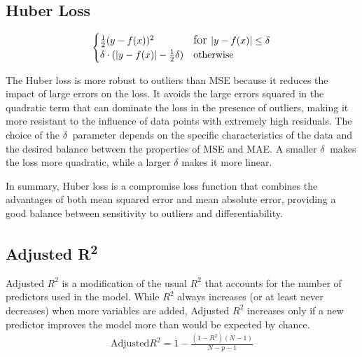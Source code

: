 \documentclass[10pt,a4paper]{article}
\begin{document}
	\subsection{Huber Loss}
			\label{Huberloss}
		
			\begin{align*}
					\begin{cases}
						\frac{1}{2}(y - f(x))^2 & \large\text{for } |y - f(x)| \leq \delta \\
						\delta \cdot (|y - f(x)| - \frac{1}{2}\delta) & \text{otherwise}
					\end{cases}
			\end{align*}
		
		
			The Huber loss is more robust to outliers than MSE because it reduces the impact of large errors on the loss. It avoids the large errors squared in the quadratic term that can dominate the loss in the presence of outliers, making it more resistant to the influence of data points with extremely high residuals.
			The choice of the $\delta\ $ parameter depends on the specific characteristics of the data and the desired balance between the properties of MSE and MAE.
			A smaller $\delta\ $ makes the loss more quadratic, while a larger $\delta$ makes it more linear.
		
			In summary, Huber loss is a compromise loss function that combines the advantages of both mean squared error and mean absolute error, providing a good balance between sensitivity to outliers and differentiability.

	\subsection{Adjusted R\textsuperscript{2}}
	Adjusted $R^2$ is a modification of the usual $R^2$ that accounts for the number of predictors used in the model.
	While $R^2$ always increases (or at least never decreases) when more variables are added,
	Adjusted $R^2$ increases only if a new predictor improves the model more than would be expected by chance.
	\begin{align*}
			\text{Adjusted} R^2
			=  1 - \frac{(1 - R^2)(N - 1)}{N - p - 1}
	\end{align*}
\end{document}
